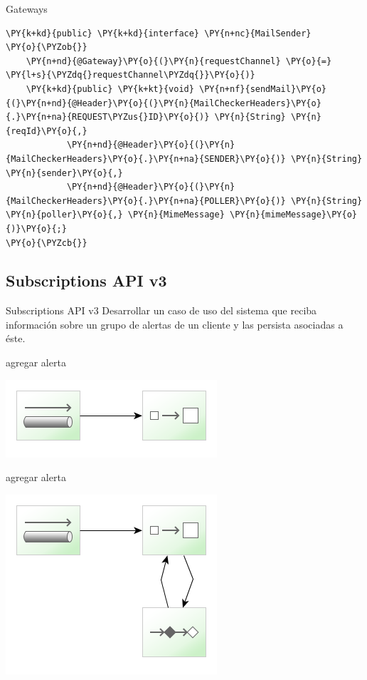 \documentclass{beamer}
\begin{document}
\begin{frame}[fragile]{Gateways}
\begin{Verbatim}[fontsize=\tiny,commandchars=\\\{\}]
\PY{k+kd}{public} \PY{k+kd}{interface} \PY{n+nc}{MailSender}
\PY{o}{\PYZob{}}
    \PY{n+nd}{@Gateway}\PY{o}{(}\PY{n}{requestChannel} \PY{o}{=} \PY{l+s}{\PYZdq{}requestChannel\PYZdq{}}\PY{o}{)}
    \PY{k+kd}{public} \PY{k+kt}{void} \PY{n+nf}{sendMail}\PY{o}{(}\PY{n+nd}{@Header}\PY{o}{(}\PY{n}{MailCheckerHeaders}\PY{o}{.}\PY{n+na}{REQUEST\PYZus{}ID}\PY{o}{)} \PY{n}{String} \PY{n}{reqId}\PY{o}{,}
            \PY{n+nd}{@Header}\PY{o}{(}\PY{n}{MailCheckerHeaders}\PY{o}{.}\PY{n+na}{SENDER}\PY{o}{)} \PY{n}{String} \PY{n}{sender}\PY{o}{,}
            \PY{n+nd}{@Header}\PY{o}{(}\PY{n}{MailCheckerHeaders}\PY{o}{.}\PY{n+na}{POLLER}\PY{o}{)} \PY{n}{String} \PY{n}{poller}\PY{o}{,} \PY{n}{MimeMessage} \PY{n}{mimeMessage}\PY{o}{)}\PY{o}{;}
\PY{o}{\PYZcb{}}
\end{Verbatim}
\end{frame}

\subsection{Subscriptions API v3}
\begin{frame}
\begin{exampleblock}{Subscriptions API v3}
Desarrollar un caso de uso del sistema que reciba información sobre un grupo de alertas de un cliente y las persista asociadas a éste.
\end{exampleblock}
\end{frame}

\begin{frame}{agregar alerta}
\begin{center}
\includegraphics[width=0.4\linewidth]{sp-int-25}
\end{center}
\end{frame}

\begin{frame}{agregar alerta}
\begin{center}
\includegraphics[width=0.4\linewidth]{sp-int-26}
\end{center}
\end{frame}
\end{document}
